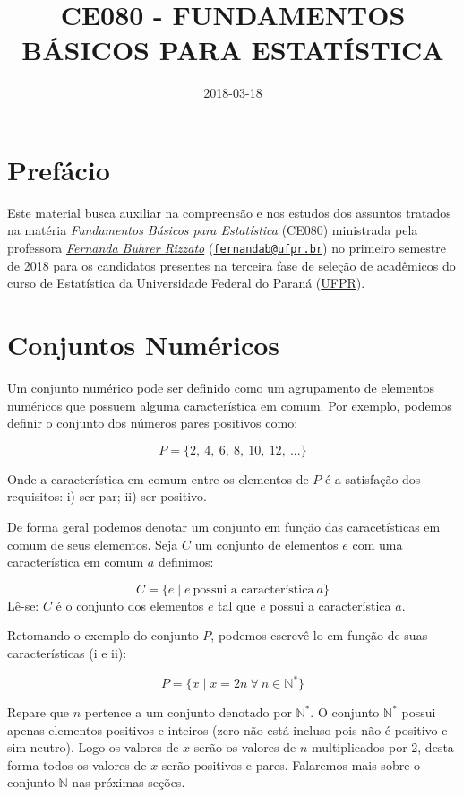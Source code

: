 \documentclass[]{book}
\title{CE080 - FUNDAMENTOS BÁSICOS PARA ESTATÍSTICA}
\author{}
\date{2018-03-18}
\begin{document}
\maketitle

{
\setcounter{tocdepth}{1}
\tableofcontents
}
\chapter*{Prefácio}\label{prefacio}

Este material busca auxiliar na compreensão e nos estudos dos assuntos
tratados na matéria \emph{Fundamentos Básicos para Estatística} (CE080)
ministrada pela professora
\href{http://leg.ufpr.br/doku.php/pessoais:fernanda}{\emph{Fernanda
Buhrer Rizzato}}
(\href{mailto:fernandab@ufpr.br}{\nolinkurl{fernandab@ufpr.br}}) no
primeiro semestre de 2018 para os candidatos presentes na terceira fase
de seleção de acadêmicos do curso de Estatística da Universidade Federal
do Paraná (\href{http://www.ufpr.br/}{UFPR}).

\chapter{Conjuntos Numéricos}\label{conjuntos-numericos}

Um conjunto numérico pode ser definido como um agrupamento de elementos
numéricos que possuem alguma característica em comum. Por exemplo,
podemos definir o conjunto dos números pares positivos como:

\[P = \{ 2,\ 4,\ 6,\ 8,\ 10,\ 12,\ ...\}\]

Onde a característica em comum entre os elementos de \(P\) é a
satisfação dos requisitos: i) ser par; ii) ser positivo.

De forma geral podemos denotar um conjunto em função das caracetísticas
em comum de seus elementos. Seja \(C\) um conjunto de elementos \(e\)
com uma característica em comum \(a\) definimos:

\[C = \{ e \mid e \ \text{possui a característica} \ a\}\] Lê-se: \(C\)
é o conjunto dos elementos \(e\) tal que \(e\) possui a característica
\(a\).

Retomando o exemplo do conjunto \(P\), podemos escrevê-lo em função de
suas características (i e ii):

\[P = \{x \mid x = 2n \ \forall \ n \in \mathbb{N}^{*} \}\]

Repare que \(n\) pertence a um conjunto denotado por \(\mathbb{N}^{*}\).
O conjunto \(\mathbb{N}^{*}\) possui apenas elementos positivos e
inteiros (zero não está incluso pois não é positivo e sim neutro). Logo
os valores de \(x\) serão os valores de \(n\) multiplicados por \(2\),
desta forma todos os valores de \(x\) serão positivos e pares. Falaremos
mais sobre o conjunto \(\mathbb{N}\) nas próximas seções.
\end{document}
